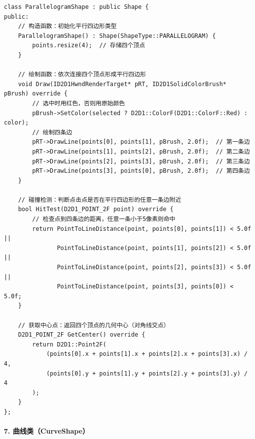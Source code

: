 \documentclass[12pt,a4paper]{article}
\begin{document}
\begin{lstlisting}[caption=ParallelogramShape类定义]
class ParallelogramShape : public Shape {
public:
    // 构造函数：初始化平行四边形类型
    ParallelogramShape() : Shape(ShapeType::PARALLELOGRAM) {
        points.resize(4);  // 存储四个顶点
    }
    
    // 绘制函数：依次连接四个顶点形成平行四边形
    void Draw(ID2D1HwndRenderTarget* pRT, ID2D1SolidColorBrush* pBrush) override {
        // 选中时用红色，否则用原始颜色
        pBrush->SetColor(selected ? D2D1::ColorF(D2D1::ColorF::Red) : color);
        // 绘制四条边
        pRT->DrawLine(points[0], points[1], pBrush, 2.0f);  // 第一条边
        pRT->DrawLine(points[1], points[2], pBrush, 2.0f);  // 第二条边
        pRT->DrawLine(points[2], points[3], pBrush, 2.0f);  // 第三条边
        pRT->DrawLine(points[3], points[0], pBrush, 2.0f);  // 第四条边
    }
    
    // 碰撞检测：判断点击点是否在平行四边形的任意一条边附近
    bool HitTest(D2D1_POINT_2F point) override {
        // 检查点到四条边的距离，任意一条小于5像素则命中
        return PointToLineDistance(point, points[0], points[1]) < 5.0f ||
               PointToLineDistance(point, points[1], points[2]) < 5.0f ||
               PointToLineDistance(point, points[2], points[3]) < 5.0f ||
               PointToLineDistance(point, points[3], points[0]) < 5.0f;
    }
    
    // 获取中心点：返回四个顶点的几何中心（对角线交点）
    D2D1_POINT_2F GetCenter() override {
        return D2D1::Point2F(
            (points[0].x + points[1].x + points[2].x + points[3].x) / 4,
            (points[0].y + points[1].y + points[2].y + points[3].y) / 4
        );
    }
};
\end{lstlisting}

\paragraph{7. 曲线类（CurveShape）}
\end{document}
